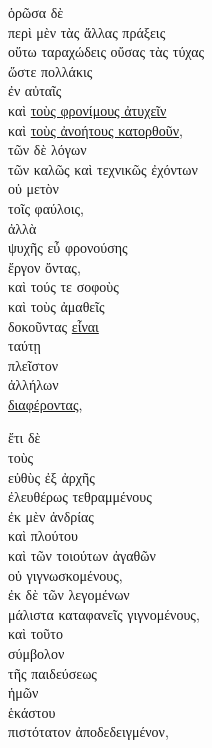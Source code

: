 {\begin{greek}
\noindent  ὁρῶσα δὲ \\
\tabto{2em} περὶ μὲν τὰς ἄλλας πράξεις \\
\tabto{2em} οὕτω ταραχώδεις οὔσας τὰς τύχας \\
\tabto{4em} ὥστε πολλάκις \\
\tabto{4em} ἐν αὐταῖς \\
\tabto{4em} καὶ \underline{τοὺς φρονίμους ἀτυχεῖν} \\
\tabto{4em} καὶ \underline{τοὺς ἀνοήτους κατορθοῦν}, \\
\tabto{2em} τῶν δὲ λόγων \\
\tabto{4em} τῶν καλῶς καὶ τεχνικῶς ἐχόντων \\
\tabto{2em} οὐ μετὸν \\
\tabto{4em} τοῖς φαύλοις, \\
\tabto{2em} ἀλλὰ \\
\tabto{4em} ψυχῆς εὖ φρονούσης \\
\tabto{2em} ἔργον ὄντας, \\
\tabto{2em} καὶ τούς τε σοφοὺς\\
\tabto{2em} καὶ τοὺς ἀμαθεῖς \\
\tabto{4em} δοκοῦντας \underline{εἶναι} \\
\tabto{6em} ταύτῃ \\
\tabto{4em} πλεῖστον \\
\tabto{6em} ἀλλήλων \\
\tabto{4em} \underline{διαφέροντας},

\tabto{2em} ἔτι δὲ \\
\tabto{4em} τοὺς \\
\tabto{6em} εὐθὺς ἐξ ἀρχῆς \\
\tabto{4em} ἐλευθέρως τεθραμμένους \\
\tabto{6em} ἐκ μὲν ἀνδρίας \\
\tabto{8em} καὶ πλούτου \\
\tabto{8em} καὶ τῶν τοιούτων ἀγαθῶν \\
\tabto{6em} οὐ γιγνωσκομένους, \\
\tabto{8em} ἐκ δὲ τῶν λεγομένων \\
\tabto{6em} μάλιστα καταφανεῖς γιγνομένους, \\
\tabto{2em} καὶ τοῦτο \\
\tabto{4em} σύμβολον \\
\tabto{6em} τῆς παιδεύσεως \\
\tabto{10em} ἡμῶν \\
\tabto{8em} ἑκάστου \\
\tabto{4em} πιστότατον ἀποδεδειγμένον,


\end{greek}}
